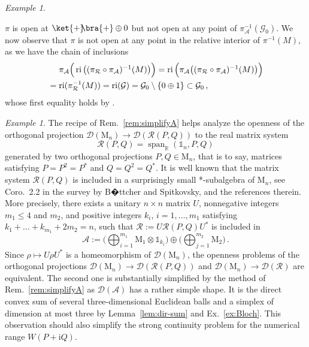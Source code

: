 \documentclass[a4paper,11pt,reqno]{amsart}
\newcommand{\R}{\mathbb{R}}
\newcommand{\M}{\mathrm{M}}
\newcommand{\cA}{\mathcal{A}}
\newcommand{\cD}{\mathcal{D}}
\newcommand{\cG}{\mathcal{G}}
\newcommand{\cR}{\mathcal{R}}
\newcommand{\ii}{\mathrm{i}}
\newcommand{\id}{\mathds{1}}
\DeclareMathOperator\ri{ri}
\DeclareMathOperator\spn{span}
\theoremstyle{definition}
\theoremstyle{remark}
\newtheorem{exa}[thm]{Example}
\numberwithin{equation}{section}
\begin{document}
\begin{exa}
\begin{enumerate}
$\pi$ is open at $\ket{+}\!\!\bra{+}\oplus0$ but not open at any point of 
$\pi_\cA^{-1}(\cG_0)$. We now observe that $\pi$ is not open at any point 
in the relative interior of $\pi^{-1}(M)$, as we have the chain of 
inclusions
\begin{align*}
&\textstyle 
\hphantom{{}={}}
\pi_\cA\Big(\ri\big((\pi_\cR\circ\pi_\cA)^{-1}(M)\big)\Big)
=\ri\Big(\pi_\cA\big((\pi_\cR\circ\pi_\cA)^{-1}(M)\big)\Big)\\
&\textstyle 
=\ri(\pi_\cR^{-1}(M))
=\ri(\cG)
=\cG_0\setminus\{0\oplus 1\}
\subset\cG_0\,,
\end{align*}
whose first equality holds by \cite[Thm.~6.6]{Rockafellar1970}.
\end{enumerate}
\end{exa}
%
\begin{exa}\label{ex:2proj}
The recipe of Rem.~\ref{rem:simplifyA} helps analyze the openness of
the orthogonal projection $\cD(\M_n)\to\cD(\cR(P,Q))$ to the real matrix system 
\[\textstyle
\cR(P,Q)=\spn_\R(\id_n,P,Q)
\]
generated by two orthogonal projections $P,Q\in\M_n$, that is to say, matrices
satisfying $P=P^2=P^\ast$ and $Q=Q^2=Q^\ast$. It is well known that the matrix 
system $\cR(P,Q)$ is included in a surprisingly small *-subalgebra of $\M_n$, 
see Coro.~2.2 in the survey \cite{BoettcherSpitkovsky2010} by B�ttcher and 
Spitkovsky, and the references therein. More precisely, there exists a unitary 
$n\times n$ matrix $U$, nonnegative integers $m_1\leq 4$ and $m_2$, and positive 
integers $k_i$, $i=1,\ldots,m_1$ satisfying $k_1+\dots+k_{m_1}+2m_2=n$, such 
that $\cR:=U\cR(P,Q)U^\ast$ is included in 
\[\textstyle
\cA:=\big(\bigoplus_{i=1}^{m_1}\M_1\otimes\id_{k_i}\big)
\oplus
\big(\bigoplus_{j=1}^{m_2}\M_2\big)\,.
\]
Since $\rho\mapsto U\rho U^\ast$ is a homeomorphism of $\cD(\M_n)$, the 
openness problems of the orthogonal projections $\cD(\M_n)\to\cD(\cR(P,Q))$ 
and $\cD(\M_n)\to\cD(\cR)$ are equivalent. The second one is substantially 
simplified by the method of Rem.~\ref{rem:simplifyA} as $\cD(\cA)$ has a 
rather simple shape. It is the direct convex sum of several three-dimensional 
Euclidean balls and a simplex of dimension at most three by
Lemma~\ref{lem:dir-sum} and Ex.~\ref{ex:Bloch}. This observation should also 
simplify the strong continuity problem for the numerical range $W(P+\ii Q)$.
\end{exa}
%
%
\end{document}
